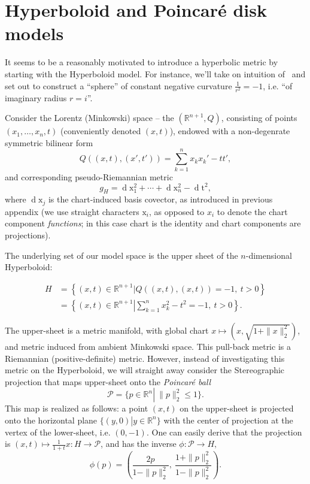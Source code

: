 \section{Hyperboloid and Poincar\'e disk models}

It seems to be a reasonably motivated to introduce a hyperbolic metric by
starting with the Hyperboloid model. For instance, we'll take on intuition
of~\cite{thurstonThree} and set out to construct a ``sphere'' of constant
negative curvature \( \frac{1}{r^2} = -1 \), i.e. ``of imaginary radius \( r=i
\)''.

Consider the Lorentz (Minkowski) space -- the \( (\mathbb{R}^{n+1}, Q) \),
consisting of points \( (x_1, \ldots, x_n, t) \) (conveniently denoted \( (x,
t) \)), endowed with a non-degenrate symmetric bilinear form
\[ Q((x, t), (x', t')) = \sum_{k=1}^n x_k x_k' - tt', \]
and corresponding pseudo-Riemannian metric \[ g_H = \operatorname{d}\mathrm{x}_1^2 +
\cdots + \operatorname{d}\mathrm{x}_n^2 - \operatorname{d}\mathrm{t}^2, \]
where \( \operatorname{d}\mathrm{x}_j \) is the chart-induced basis covector, as
introduced in previous appendix (we use straight characters \( \mathrm{x}_i \),
as opposed to \( x_i \) to denote the chart component \emph{functions}; in this
case chart is the identity and chart components are projections).

The underlying set of our model space is the upper sheet of the \(n\)-dimensional
Hyperboloid:

\begin{align*}
H &= \left\{ (x, t) \in \mathbb{R}^{n+1} \left| Q((x,t), (x,t)) = -1,~ t>0 \right.\right\}\\
&= \left\{ (x, t) \in \mathbb{R}^{n+1} \left| \sum_{k=1}^n x_k^2 - t^2 = -1,~t>0 \right.\right\}.
\end{align*}

The upper-sheet is a metric manifold, with global chart \( x \mapsto (x,
\sqrt{1 + \|x\|_2^2}) \), and metric induced from ambient Minkowski space. This
pull-back metric is a Riemannian (positive-definite) metric. However, instead
of investigating this metric on the Hyperboloid, we will straight away consider
the Stereographic projection that maps upper-sheet onto the \emph{Poincar\'e
ball} \[ \mathcal{P} = \{ p\in\mathbb{R}^n\left|~\|p\|_2^2 \leq 1\right.\}. \]
This map is realized as follows: a point \( (x, t) \) on the upper-sheet is
projected onto the horizontal plane \( \{ (y, 0) \left| y\in
\mathbb{R}^{n}\right. \} \) with the center of projection at the vertex of the
lower-sheet, i.e. \( (0, -1) \). One can easily derive that the projection is \(
(x, t) \mapsto \frac{1}{1+t}x: H\to\mathcal{P} \), and has the inverse \(
\phi:\mathcal{P}\to H, \) \[ \phi(p) = (\frac{2p}{1 -
\|p\|_2^2},~\frac{1+\|p\|_2^2}{1-\|p\|_2^2}). \]

